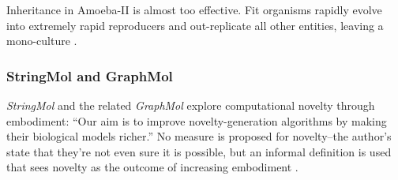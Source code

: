 Inheritance in Amoeba-II is almost too effective. Fit organisms rapidly evolve into extremely rapid reproducers and out-replicate all other entities, leaving a mono-culture \parencite{Pargellis2001}.

%
%
%
%
\subsubsection{StringMol and GraphMol}

\emph{StringMol} \parencite{Hickinbotham2011} and the related \emph{GraphMol} \parencite{Nellis2012, Nellis2014} explore computational novelty through embodiment: ``Our aim is to improve novelty-generation algorithms by making their biological models richer.'' No measure is proposed for novelty--the author's state that they're not even sure it is possible, but an informal definition is used that sees novelty as the outcome of increasing embodiment \parencite[p.87]{Nellis2012}. 

